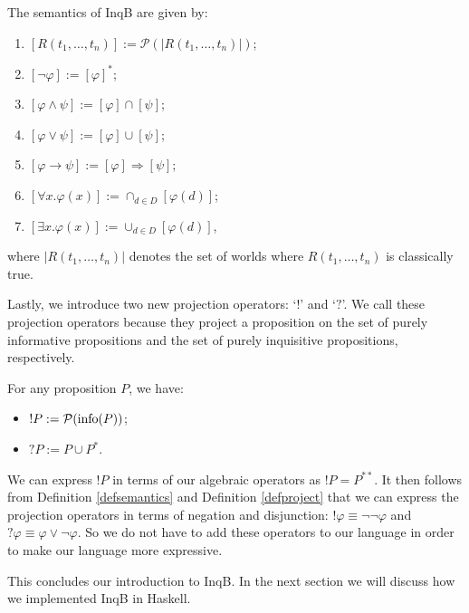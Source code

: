 \begin{defi}\label{defsemantics}
 The semantics of \textsf{InqB} are given by:
 \begin{enumerate}\setlength\itemsep{-0.3em}
     \item $[R(t_1,\dots,t_n)] := \mathcal{P}(|R(t_1,\dots,t_n)|)$;
     \item $[\neg \varphi]:=[\varphi]^*$;
     \item $[\varphi\land\psi]:=[\varphi]\cap [\psi]$;
     \item $[\varphi\lor\psi]:=[\varphi]\cup [\psi]$;
     \item $[\varphi\rightarrow\psi]:=[\varphi]\Rightarrow [\psi]$;
     \item $[\forall x . \varphi(x)]:= \cap_{d\in D} [\varphi(d)]$;
     \item $[\exists x . \varphi(x)]:= \cup_{d\in D} [\varphi(d)]$,
 \end{enumerate}
 where $|R(t_1,\dots,t_n)|$ denotes the set of worlds where $R(t_1,\dots,t_n)$ is classically true.
\end{defi}
Lastly, we introduce two new projection operators: `$!$' and `$?$'. We call these projection operators because they project a proposition on the set of purely informative propositions and the set of purely inquisitive propositions, respectively.

\begin{defi}\label{defproject}
 For any proposition $P$, we have:
 \begin{itemize}
     \item $!P:= \mathcal{P}(\textrm{info}(P))$;
     \item $?P:= P\cup P^*$.
 \end{itemize}
\end{defi}

We can express $!P$ in terms of our algebraic operators as $!P=P^{**}$. It then follows from Definition \ref{defsemantics} and Definition \ref{defproject} that we can express the projection operators in terms of negation and disjunction: $!\varphi \equiv \neg\neg\varphi$ and $?\varphi\equiv \varphi \lor \neg \varphi$. So we do not have to add these operators to our language in order to make our language more expressive.

This concludes our introduction to \textsf{InqB}. In the next section we will discuss how we implemented \textsf{InqB} in Haskell. 


